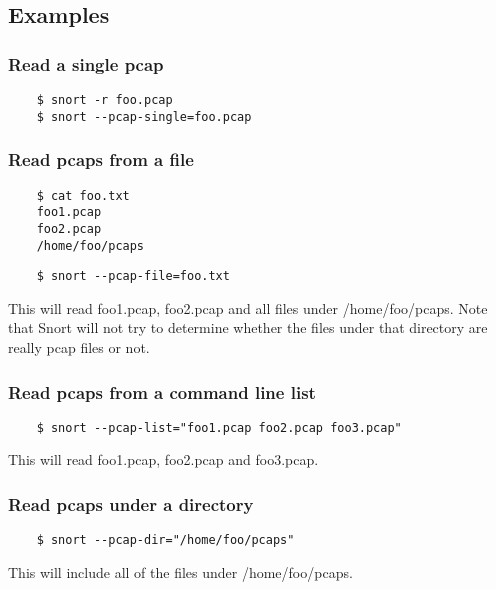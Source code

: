 \documentclass[english]{report}
\begin{document}
\subsection{Examples}

\subsubsection{Read a single pcap}

\begin{verbatim}
    $ snort -r foo.pcap
    $ snort --pcap-single=foo.pcap
\end{verbatim}

\subsubsection{Read pcaps from a file}

\begin{verbatim}
    $ cat foo.txt
    foo1.pcap
    foo2.pcap
    /home/foo/pcaps
\end{verbatim}

\begin{verbatim}
    $ snort --pcap-file=foo.txt
\end{verbatim}

This will read foo1.pcap, foo2.pcap and all files under /home/foo/pcaps.  Note
that Snort will not try to determine whether the files under that directory are
really pcap files or not.

\subsubsection{Read pcaps from a command line list}

\begin{verbatim}
    $ snort --pcap-list="foo1.pcap foo2.pcap foo3.pcap"
\end{verbatim}

This will read foo1.pcap, foo2.pcap and foo3.pcap.

\subsubsection{Read pcaps under a directory}

\begin{verbatim}
    $ snort --pcap-dir="/home/foo/pcaps"
\end{verbatim}

This will include all of the files under /home/foo/pcaps.
\end{document}
